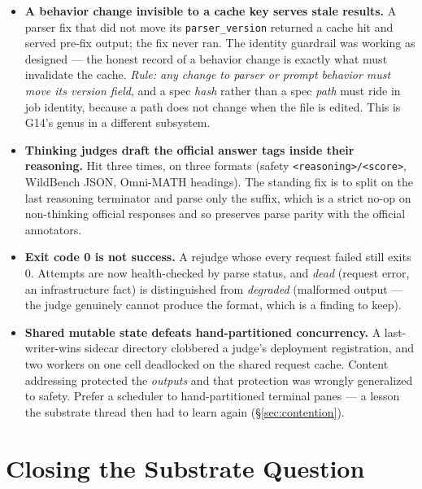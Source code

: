 \documentclass[11pt]{report}
\newcommand{\code}[1]{\texttt{#1}}
\begin{document}
\begin{itemize}[nosep]
  \item \textbf{A behavior change invisible to a cache key serves stale results.} A
        parser fix that did not move its \code{parser\_version} returned a cache hit
        and served pre-fix output; the fix never ran. The identity guardrail was
        working as designed --- the honest record of a behavior change is exactly
        what must invalidate the cache. \emph{Rule: any change to parser or prompt
        behavior must move its version field}, and a spec \emph{hash} rather than a
        spec \emph{path} must ride in job identity, because a path does not change
        when the file is edited. This is G14's genus in a different subsystem.
  \item \textbf{Thinking judges draft the official answer tags inside their
        reasoning.} Hit three times, on three formats (safety
        \code{<reasoning>/<score>}, WildBench JSON, Omni-MATH headings). The standing
        fix is to split on the last reasoning terminator and parse only the suffix,
        which is a strict no-op on non-thinking official responses and so preserves
        parse parity with the official annotators.
  \item \textbf{Exit code 0 is not success.} A rejudge whose every request failed
        still exits 0. Attempts are now health-checked by parse status, and
        \emph{dead} (request error, an infrastructure fact) is distinguished from
        \emph{degraded} (malformed output --- the judge genuinely cannot produce the
        format, which is a finding to keep).
  \item \textbf{Shared mutable state defeats hand-partitioned concurrency.} A
        last-writer-wins sidecar directory clobbered a judge's deployment
        registration, and two workers on one cell deadlocked on the shared request
        cache. Content addressing protected the \emph{outputs} and that protection
        was wrongly generalized to safety. Prefer a scheduler to hand-partitioned
        terminal panes --- a lesson the substrate thread then had to learn again
        (\S\ref{sec:contention}).
\end{itemize}

\chapter{Closing the Substrate Question}
\label{chap:substrate-closed}
\end{document}

